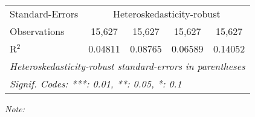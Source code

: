 \begin{table}[htbp!]
\begin{adjustbox}{width = 1\textwidth, max height = 0.95\textheight, center}
\begin{threeparttable}[b]
\begin{tabular}{lcccc}
            \midrule 
            Standard-Errors & \multicolumn{4}{c}{Heteroskedasticity-robust} \\ 
            Observations         & 15,627                          & 15,627                         & 15,627                         & 15,627\\  
            R$^2$                & 0.04811                         & 0.08765                        & 0.06589                        & 0.14052\\  
            \midrule \midrule
            \multicolumn{5}{l}{\emph{Heteroskedasticity-robust standard-errors in parentheses}}\\
            \multicolumn{5}{l}{\emph{Signif. Codes: ***: 0.01, **: 0.05, *: 0.1}}\\
         \end{tabular}
         
         \begin{tablenotes}\item \medskip \textit{Note:}
         \end{tablenotes}
      \end{threeparttable}
   \end{adjustbox}
\end{table}


